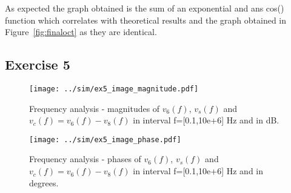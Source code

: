 As expected the graph obtained is the sum of an exponential and ans cos() function which correlates with theoretical results and the graph obtained in 
Figure~\ref{fig:finaloct} as they are identical.
\subsection{Exercise 5}
 

\begin{figure}[H]
  \centering
  \texttt{[image: ../sim/ex5\_image\_magnitude.pdf]}
  \caption{Frequency analysis - magnitudes of $v_6(f)$, $v_s(f)$ and $v_c(f)=v_6(f)-v_8(f)$ in interval f=[0.1,10e+6] Hz and in dB.}
  \label{fig:Ex5_Image_Magnitude}
\end{figure}



\begin{figure}[H]
  \centering
  \texttt{[image: ../sim/ex5\_image\_phase.pdf]}
  \caption{Frequency analysis - phases of $v_6(f)$, $v_s(f)$ and $v_c(f)=v_6(f)-v_8(f)$ in interval f=[0.1,10e+6] Hz and in degrees.}
  \label{fig:Ex5_Image_Phase}
\end{figure}

